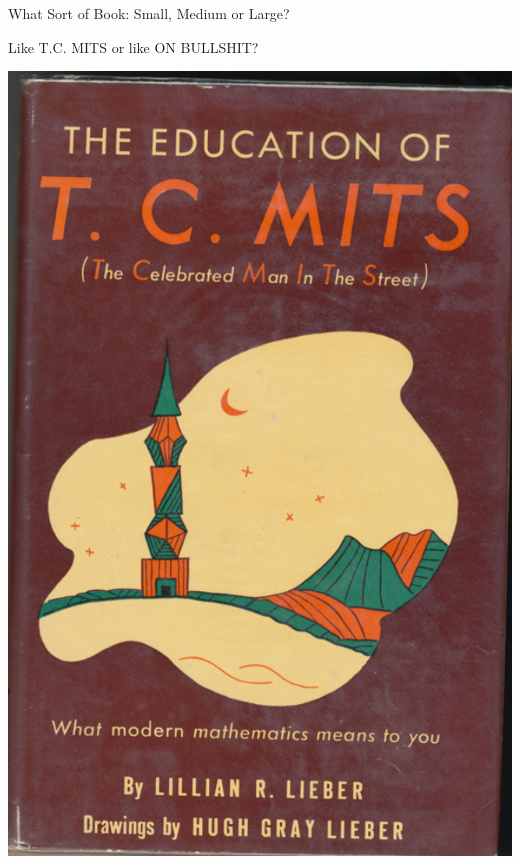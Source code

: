 \documentclass{beamer}
\begin{document}
\begin{frame}{What Sort of Book: Small, Medium or Large?}
  \begin{center}
    Like T.\thinspace{}C. MITS or like ON BULLSHIT?
    \vspace{1ex}

    \includegraphics[height=.75\textheight]{pics/tc-mits}
    \hspace{2em}

\end{center}
\end{frame}
\end{document}
